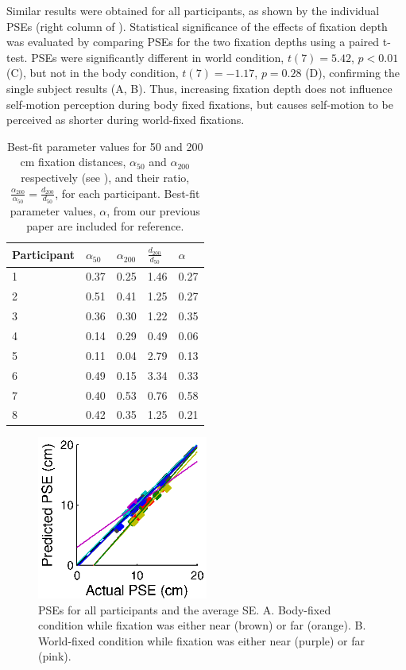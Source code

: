 Similar results were obtained for all participants, as shown by the individual PSEs (right column of ). Statistical significance of the effects of fixation depth was evaluated by comparing PSEs for the two fixation depths using a paired t-test. PSEs were significantly different in world condition, $t(7) = 5.42$, $p < 0.01$ (C), but not in the body condition, $t(7) = -1.17$, $p = 0.28$ (D), confirming the single subject results (A, B). Thus, increasing fixation depth does not influence self-motion perception during body fixed fixations, but causes self-motion to be perceived as shorter during world-fixed fixations.

\begin{table}
    \begin{tabular}{l|lll|l}
	Participant & $\alpha_{50}$ & $\alpha_{200}$ & $\frac{d_{200}}{d_{50}}$ & $\alpha$ \\
    \hline
	1 & 0.37 & 0.25 & 1.46 & 0.27 \\
	2 & 0.51 & 0.41 & 1.25 & 0.27 \\
	3 & 0.36 & 0.30 & 1.22 & 0.35 \\
	4 & 0.14 & 0.29 & 0.49 & 0.06 \\
	5 & 0.11 & 0.04 & 2.79 & 0.13 \\
	6 & 0.49 & 0.15 & 3.34 & 0.33\\
	7 & 0.40 & 0.53 & 0.76 & 0.58 \\
	8 & 0.42 & 0.35 & 1.25 & 0.21 \\
    \end{tabular}

    \caption{Best-fit parameter values for 50 and 200 \si{\centi\metre} fixation distances, $\alpha_{50}$ and $\alpha_{200}$ respectively (see ), and their ratio, $\frac{\alpha_{200}}{\alpha_{50}} = \frac{d_{200}}{d_{50}}$, for each participant. Best-fit parameter values, $\alpha$, from our previous paper \protect\cite{clemens2015a} are included for reference.}

    \label{p4:tab2}
\end{table}

\begin{figure}
    \includegraphics[width=0.5\textwidth]{src/paper4/paper4_figure4.eps}

	\caption{PSEs for all participants and the average \textpm SE. A.  Body-fixed condition while fixation was either near (brown) or far (orange). B. World-fixed condition while fixation was either near (purple) or far (pink).}
	\label{p4:fig4}
\end{figure}

